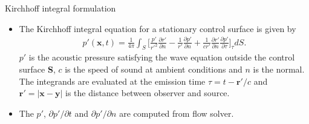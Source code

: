 \documentclass[10pt, aspectratio=169]{beamer}
\begin{document}
\begin{frame}{Kirchhoff integral formulation}
	\begin{itemize}
		\item The Kirchhoff integral equation for a stationary control surface is given by
		      \begin{equation}
			      \begin{split}
				      p'(\mathbf{x}, t) = \frac{1}{4\pi}\int_{S}\Big[  \frac{p'}{r'^{2}}\frac{\partial r'}{\partial n} - \frac{1}{r'}\frac{\partial p'}{\partial n} + \frac{1}{c r'}\frac{\partial r'}{\partial n}\frac{\partial p'}{\partial \tau} \Big]_{\tau} dS.
			      \end{split}
		      \end{equation}
		      $p'$ is the acoustic pressure satisfying the wave equation outside the control surface \textbf{S}, $c$ is the speed of sound at ambient conditions and $n$ is the normal.
		      The integrands are evaluated at the emission time $\tau = t - \mathbf{r'}/c$ and $\mathbf{r'}= |\mathbf{x} - \mathbf{y}|$ is the distance between observer and source.
		\item The $p'$, ${\partial p'}/{\partial t}$ and ${\partial p'}/{\partial n}$ are computed from flow solver.
	\end{itemize}
\end{frame}
\end{document}
